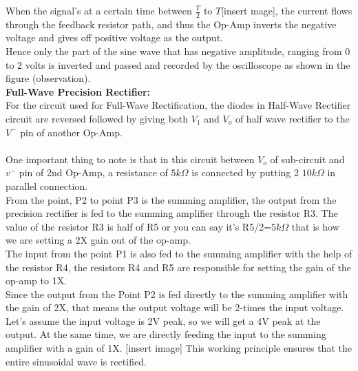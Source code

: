 \documentclass[a4paper,12pt]{article}
\begin{document}
When the signal's at a certain time between $\frac{T}{2}$ to $T$[insert mage], the current flows through the feedback resistor path, and thus the Op-Amp inverts the negative voltage and gives off positive voltage as the output.\\
Hence only the part of the sine wave that has negative amplitude, ranging from 0 to 2 volts is inverted and passed and recorded by the oscilloscope as shown in the figure (observation).\\
\textbf{Full-Wave Precision Rectifier:}\\
For the circuit used for Full-Wave Rectification, the diodes in Half-Wave Rectifier circuit are reversed followed by giving both $V_1$ and $V_o$ of half wave rectifier to the $V^-$ pin of another Op-Amp.\\\\ One important thing to note is that in this circuit between $V_o$ of sub-circuit and $v^-$ pin of 2nd Op-Amp, a resistance of $5k\Omega$ is connected by putting 2 $10k\Omega$ in parallel connection.\\
From the point, P2 to point P3 is the summing amplifier, the output from the precision rectifier is fed to the summing amplifier through the resistor R3. The value of the resistor R3 is half of R5 or you can say it’s R5/2=$5k\Omega$ that is how we are setting a 2X gain out of the op-amp.\\
The input from the point P1 is also fed to the summing amplifier with the help of the resistor R4, the resistors R4 and R5 are responsible for setting the gain of the op-amp to 1X.\\
Since the output from the Point P2 is fed directly to the summing amplifier with the gain of 2X, that means the output voltage will be 2-times the input voltage. Let's assume the input voltage is 2V peak, so we will get a 4V peak at the output. At the same time, we are directly feeding the input to the summing amplifier with a gain of 1X.
[insert image]
This working principle ensures that the entire sinusoidal wave is rectified. 
\end{document}
